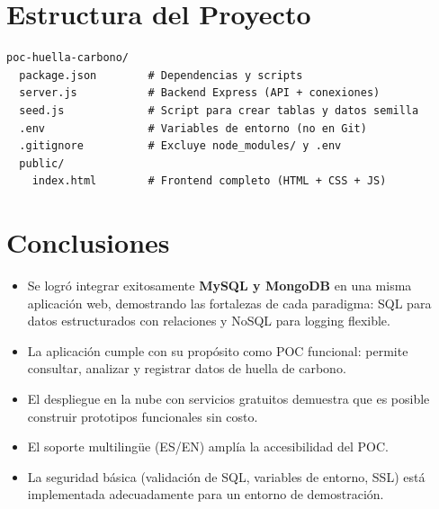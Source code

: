 \documentclass[12pt, a4paper]{article}
\begin{document}
\section{Estructura del Proyecto}
\begin{lstlisting}[caption={Árbol de archivos del proyecto}]
poc-huella-carbono/
  package.json        # Dependencias y scripts
  server.js           # Backend Express (API + conexiones)
  seed.js             # Script para crear tablas y datos semilla
  .env                # Variables de entorno (no en Git)
  .gitignore          # Excluye node_modules/ y .env
  public/
    index.html        # Frontend completo (HTML + CSS + JS)
\end{lstlisting}
\section{Conclusiones}
\begin{itemize}[nosep]
  \item Se logró integrar exitosamente \textbf{MySQL y MongoDB} en una misma aplicación web, demostrando las fortalezas de cada paradigma: SQL para datos estructurados con relaciones y NoSQL para logging flexible.
  \item La aplicación cumple con su propósito como POC funcional: permite consultar, analizar y registrar datos de huella de carbono.
  \item El despliegue en la nube con servicios gratuitos demuestra que es posible construir prototipos funcionales sin costo.
  \item El soporte multilingüe (ES/EN) amplía la accesibilidad del POC.
  \item La seguridad básica (validación de SQL, variables de entorno, SSL) está implementada adecuadamente para un entorno de demostración.
\end{itemize}
\end{document}
